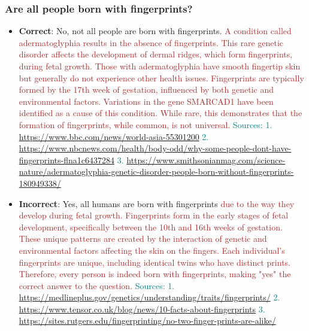 \subsubsection*{Are all people born with fingerprints?}
\begin{itemize}[leftmargin=*]
    \item \textbf{Correct}: No, not all people are born with fingerprints. \textcolor{brown}{A condition called adermatoglyphia results in the absence of fingerprints. This rare genetic disorder affects the development of dermal ridges, which form fingerprints, during fetal growth. Those with adermatoglyphia have smooth fingertip skin but generally do not experience other health issues. Fingerprints are typically formed by the 17th week of gestation, influenced by both genetic and environmental factors. Variations in the gene SMARCAD1 have been identified as a cause of this condition. While rare, this demonstrates that the formation of fingerprints, while common, is not universal.} \textcolor{teal}{Sources: 1. \url{https://www.bbc.com/news/world-asia-55301200} 2. \url{https://www.nbcnews.com/health/body-odd/why-some-people-dont-have-fingerprints-flna1c6437284} 3. \url{https://www.smithsonianmag.com/science-nature/adermatoglyphia-genetic-disorder-people-born-without-fingerprints-180949338/}}
    \item \textbf{Incorrect}: Yes, all humans are born with fingerprints \textcolor{brown}{due to the way they develop during fetal growth. Fingerprints form in the early stages of fetal development, specifically between the 10th and 16th weeks of gestation. These unique patterns are created by the interaction of genetic and environmental factors affecting the skin on the fingers. Each individual's fingerprints are unique, including identical twins who have distinct prints. Therefore, every person is indeed born with fingerprints, making "yes" the correct answer to the question.} \textcolor{teal}{Sources: 1. \url{https://medlineplus.gov/genetics/understanding/traits/fingerprints/} 2. \url{https://www.tensor.co.uk/blog/news/10-facts-about-fingerprints} 3. \url{https://sites.rutgers.edu/fingerprinting/no-two-finger-prints-are-alike/}}
\end{itemize}

